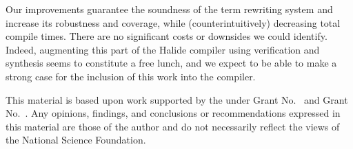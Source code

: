 \documentclass[acmsmall,review,anonymous]{acmart}\settopmatter{printfolios=true,printccs=false,printacmref=false}
\begin{document}
Our improvements guarantee the soundness of the term rewriting system
and increase its robustness and coverage, while (counterintuitively)
decreasing total compile times. There are no significant costs or
downsides we could identify. Indeed, augmenting this part of the
Halide compiler using verification and synthesis seems to constitute a
free lunch, and we expect to be able to make a strong case for the
inclusion of this work into the compiler.


\begin{acks}                            %
  This material is based upon work supported by the
   under Grant
  No.~ and Grant
  No.~.  Any opinions, findings, and
  conclusions or recommendations expressed in this material are those
  of the author and do not necessarily reflect the views of the
  National Science Foundation.
\end{acks}



\end{document}
